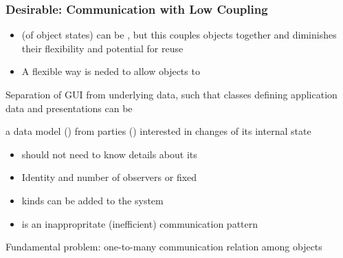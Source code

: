 \subsubsection{Desirable: Communication with Low Coupling}
\begin{defBox}[title=Change Propagation]
    \begin{itemize}
        \item {} (of object states) can be , but this couples objects together and diminishes their flexibility and potential for reuse
        \item A flexible way is neded to allow objects to 
    \end{itemize}
\end{defBox}
\begin{defBox}[title=Representative Scenario]
    Separation of GUI from underlying data, such that classes defining application data and presentations can be 
\end{defBox}
\begin{defBox}[title=Task]
     a data model () from parties () interested in changes of its internal state
\end{defBox}
\begin{defBox}[title=Requirements]
    \begin{itemize}
        \item {} should not need to know details about its 
        \item Identity and number of observers  or fixed
        \item {} kinds can be added to the system 
        \item {} is an inappropritate (inefficient) communication pattern
    \end{itemize}
\end{defBox}
\begin{defBox}
    Fundamental problem: one-to-many communication relation among objects
\end{defBox}
